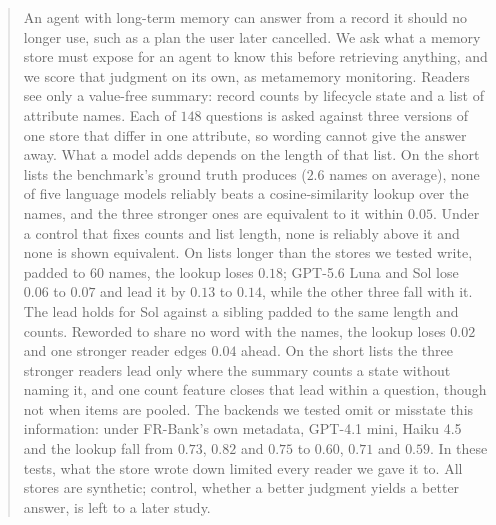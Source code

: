 \begin{abstract}
An agent with long-term memory can answer from a record it should no longer use, such as a plan the user later cancelled.
We ask what a memory store must expose for an agent to know this before retrieving anything, and we score that judgment on its own, as metamemory monitoring.
Readers see only a value-free summary: record counts by lifecycle state and a list of attribute names.
Each of $148$ questions is asked against three versions of one store that differ in one attribute, so wording cannot give the answer away.
What a model adds depends on the length of that list.
On the short lists the benchmark's ground truth produces ($2.6$ names on average), none of five language models reliably beats a cosine-similarity lookup over the names, and the three stronger ones are equivalent to it within $0.05$. Under a control that fixes counts and list length, none is reliably above it and none is shown equivalent.
On lists longer than the stores we tested write, padded to $60$ names, the lookup loses $0.18$; \mbox{GPT-5.6} Luna and Sol lose $0.06$ to $0.07$ and lead it by $0.13$ to $0.14$, while the other three fall with it. The lead holds for Sol against a sibling padded to the same length and counts.
Reworded to share no word with the names, the lookup loses $0.02$ and one stronger reader edges $0.04$ ahead.
On the short lists the three stronger readers lead only where the summary counts a state without naming it, and one count feature closes that lead within a question, though not when items are pooled.
The backends we tested omit or misstate this information: under FR-Bank's own metadata, \mbox{GPT-4.1} mini, Haiku 4.5 and the lookup fall from $0.73$, $0.82$ and $0.75$ to $0.60$, $0.71$ and $0.59$.
In these tests, what the store wrote down limited every reader we gave it to.
All stores are synthetic; control, whether a better judgment yields a better answer, is left to a later study.
\end{abstract}
